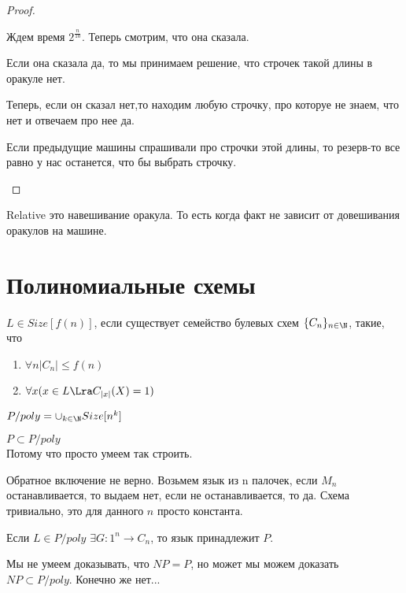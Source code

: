 \begin{proof}
\begin{enumerate}
	Ждем время $2^{\frac{n}{10}}$. Теперь смотрим, что она сказала. 
	
	Если она сказала да, то мы принимаем решение, что строчек такой длины в оракуле нет. 
	
	Теперь, если он сказал нет,то находим любую строчку, про которуе не знаем, что нет и отвечаем про нее да. 
	
	Если предыдущие машины спрашивали про строчки этой длины, то резерв-то все равно у нас останется, что бы выбрать строчку.  
\end{enumerate}
\end{proof}

\begin{Def}
	Relative это навешивание оракула. То есть когда факт не зависит от довешивания оракулов на машине. 
\end{Def}

\section{Полиномиальные схемы}
\begin{Def}
$L \in Size[f(n)]$, если существует семейство булевых схем $\{C_n\}_{n \in \N}$, такие, что 
\begin{enumerate}
\item $\forall n |C_n| \le f(n)$\\
\item $\forall x(x \in L \Lra C_{|x|}(X) = 1)$
\end{enumerate}
\end{Def}
\begin{Def}
$P/poly = \cup_{k \in \N}Size[n^k]$
\end{Def}
$P \subset P/poly$\\
Потому что просто умеем так строить. 

Обратное включение не верно. Возьмем язык из n палочек, если $M_n$ останавливается, 
то выдаем нет, если не останавливается, то да. Схема тривиально, это для данного $n$ 
просто константа. 

Если $L \in P/poly$
$\exists G \colon 1^n \to C_n$, то язык принадлежит $P$.

Мы не умеем доказывать, что $NP = P$, но может
мы можем доказать $NP \subset P/poly$. Конечно же нет...

